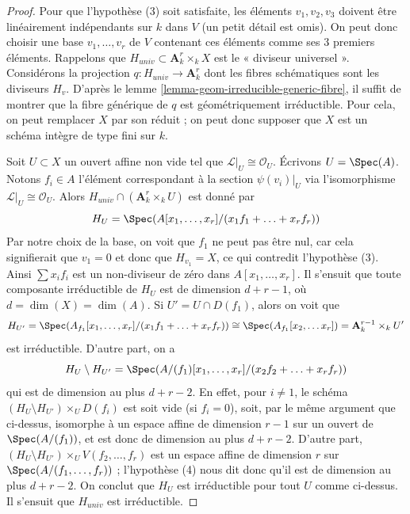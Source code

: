 \begin{proof}
Pour que l'hypothèse (3) soit satisfaite, les éléments $v_1, v_2, v_3$
doivent être linéairement indépendants sur $k$ dans $V$ (un petit détail est omis).
On peut donc choisir une base $v_1, \ldots, v_r$ de $V$ contenant
ces éléments comme ses $3$ premiers éléments. Rappelons que
$H_{univ} \subset \mathbf{A}^r_k \times_k X$ est le « diviseur universel ».
Considérons la projection $q : H_{univ} \to \mathbf{A}^r_k$
dont les fibres schématiques sont les diviseurs $H_v$. D'après le
lemme \ref{lemma-geom-irreducible-generic-fibre},
il suffit de montrer que la fibre générique de $q$ est géométriquement
irréductible.
Pour cela, on peut remplacer $X$ par son réduit ; on peut donc
supposer que $X$ est un schéma intègre de type fini sur $k$.

\medskip\noindent
Soit $U \subset X$ un ouvert affine non vide tel que
$\mathcal{L}|_U \cong \mathcal{O}_U$. Écrivons $U = \Spec(A)$.
Notons $f_i \in A$ l'élément correspondant à la section $\psi(v_i)|_U$
via l'isomorphisme $\mathcal{L}|_U \cong \mathcal{O}_U$.
Alors $H_{univ} \cap (\mathbf{A}^r_k \times_k U)$ est donné par
$$
H_U = \Spec(A[x_1, \ldots, x_r]/(x_1f_1 + \ldots + x_rf_r))
$$
Par notre choix de la base, on voit que $f_1$ ne peut pas être nul, car cela
signifierait que $v_1 = 0$ et donc que $H_{v_1} = X$, ce qui contredit
l'hypothèse (3). Ainsi $\sum x_if_i$ est un non-diviseur de zéro dans
$A[x_1, \ldots, x_r]$.
Il s'ensuit que toute composante irréductible de $H_U$ est de dimension
$d + r - 1$, où $d = \dim(X) = \dim(A)$. Si $U' = U \cap D(f_1)$,
alors on voit que
$$
H_{U'} =
\Spec(A_{f_1}[x_1, \ldots, x_r]/(x_1f_1 + \ldots + x_rf_r)) \cong
\Spec(A_{f_1}[x_2, \ldots x_r]) =
\mathbf{A}^{r - 1}_k \times_k U'
$$
est irréductible. D'autre part, on a
$$
H_U \setminus H_{U'} =
\Spec(A/(f_1)[x_1, \ldots, x_r]/(x_2f_2 + \ldots + x_rf_r))
$$
qui est de dimension au plus $d + r - 2$. En effet, pour $i \not = 1$,
le schéma $(H_U \setminus H_{U'}) \times_U D(f_i)$ est soit vide
(si $f_i = 0$), soit, par le même argument que ci-dessus, isomorphe à un espace affine de dimension $r - 1$
sur un ouvert de $\Spec(A/(f_1))$, et est donc de
dimension au plus $d + r - 2$.
D'autre part, $(H_U \setminus H_{U'}) \times_U V(f_2, \ldots, f_r)$
est un espace affine de dimension $r$ sur $\Spec(A/(f_1, \ldots, f_r))$ ;
l'hypothèse (4) nous dit donc qu'il est de dimension au plus
$d + r - 2$. On conclut que $H_U$ est irréductible pour tout $U$ comme ci-dessus.
Il s'ensuit que $H_{univ}$ est irréductible.


\end{proof}
